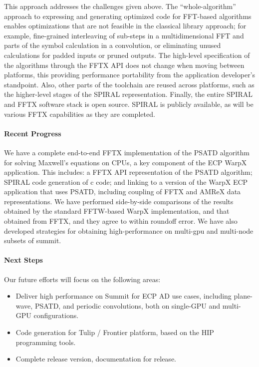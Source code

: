 {This approach addresses the challenges given above. The ``whole-algorithm'' approach to expressing and generating optimized code for FFT-based algorithms enables optimizations that are not feasible in the classical library approach; for example, fine-grained interleaving of sub-steps in a multidimensional FFT and parts of the symbol calculation in a convolution, or eliminating unused calculations for padded inputs or pruned outputs. The high-level specification of the algorithms through the FFTX API does not change when moving between platforms, this providing performance portability from the application developer's standpoint. Also, other parts of the toolchain are reused across platforms, such as the higher-level stages of the SPIRAL representation. Finally, the entire SPIRAL and FFTX software stack is open source. SPIRAL is publicly available, as will be various FFTX capabilities as they are completed.

\paragraph{Recent Progress}

We have a complete end-to-end FFTX implementation of the PSATD algorithm for solving Maxwell's equations on CPUs, a key component of the ECP WarpX application. This includes: a FFTX API representation of the PSATD algorithm; SPIRAL code generation of c code; and linking to a version of the WarpX ECP application that uses PSATD, including coupling of FFTX and AMReX data representations. We have performed side-by-side comparisons of the results obtained by the standard FFTW-based WarpX implementation, and that obtained from FFTX, and they agree to within roundoff error.
We have also developed strategies for obtaining high-performance on multi-gpu and multi-node subsets of summit.

\paragraph{Next Steps} Our future efforts will focus on the following areas:
\begin{itemize}
\item Deliver high performance on Summit for ECP AD use cases, including plane-wave, PSATD, and periodic convolutions, both on single-GPU and multi-GPU configurations.
\item Code generation for Tulip / Frontier platform, based on the HIP programming tools.
\item Complete release version, documentation for release.
\end{itemize}
} %



